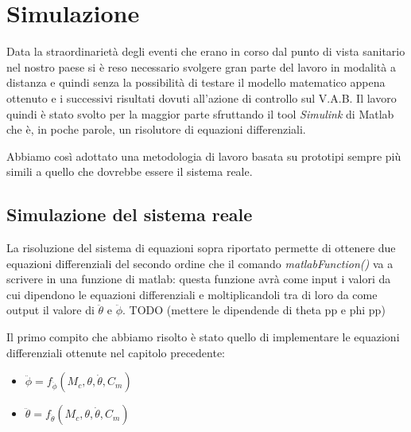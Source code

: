 \chapter{Simulazione}
Data la straordinarietà degli eventi che erano in corso dal punto di vista sanitario nel nostro paese si è reso necessario svolgere gran parte del lavoro in modalità a distanza e quindi senza la possibilità di testare il modello matematico appena ottenuto e i successivi risultati dovuti all'azione di controllo sul V.A.B. Il lavoro quindi è stato svolto per la maggior parte sfruttando il tool \textit{Simulink} di Matlab che è, in poche parole, un risolutore di equazioni differenziali.

Abbiamo così adottato una metodologia di lavoro basata su prototipi sempre più simili a quello che dovrebbe essere il sistema reale.
\section{Simulazione del sistema reale}
\label{sec:simulazione_reale}
La risoluzione del sistema di equazioni sopra riportato permette di ottenere due equazioni differenziali del secondo ordine che il comando \textit{matlabFunction()} va a scrivere in una funzione di matlab: questa funzione avrà come input i valori da cui dipendono le equazioni differenziali e moltiplicandoli tra di loro da come output il valore di $\ddot{\theta}$ e $\ddot{\phi}$.
TODO (mettere le dipendende di theta pp e phi pp)


Il primo compito che abbiamo risolto è stato quello di implementare le equazioni differenziali ottenute nel capitolo precedente:
\begin{itemize}
	\item $\ddot{\phi} = f_{\ddot{\phi}} (M_c,\theta,\dot{\theta},C_m)$
	\item $\ddot{\theta} = f_{\ddot{\theta}} (M_c,\theta,\dot{\theta},C_m)$
\end{itemize}

